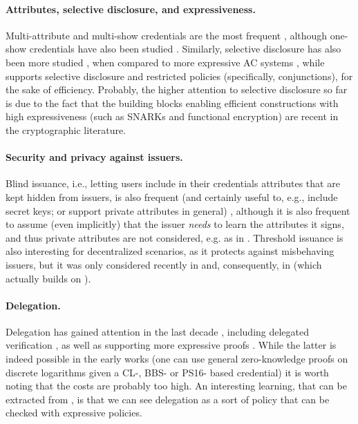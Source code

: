 \paragraph{Attributes, selective disclosure, and expressiveness.} %
Multi-attribute and multi-show credentials are the most frequent
\cite{cks10,cl11,cdhk15,ckl+15,fhs19,sms+19,halp20,hs21}, although one-show
credentials have also been studied \cite{bran00}.
Similarly, selective disclosure has also been more studied
\cite{cks10,cl11,cdhk15,sms+19,halp20,hs21}, when compared to 
more expressive AC systems \cite{bcc+09,cklm14,dmm+18}, while \cite{fhs19}
supports selective disclosure and restricted policies (specifically,
conjunctions), for the sake of efficiency. Probably, the higher attention to
selective disclosure so far is due to the fact that the building blocks enabling
efficient constructions with high expressiveness (such as SNARKs and functional
encryption) are recent in the cryptographic literature.

\paragraph{Security and privacy against issuers.} %
Blind issuance, i.e., letting users include in their credentials attributes that
are kept hidden from issuers, is also frequent (and certainly useful to, e.g.,
include secret keys; or support private attributes in general)
\cite{cklm14,ckl+15}, although it is also frequent to assume (even implicitly)
that the issuer \emph{needs} to learn the attributes it signs, and thus private
attributes are not considered, e.g. as in \cite{dmm+18,fhs19,sms+19}.
%
Threshold issuance is also interesting for decentralized scenarios, as it
protects against misbehaving issuers, but it was only considered recently in
\cite{sms+19} and, consequently, in \cite{halp20} (which actually builds on
\cite{sms+19}). 

\paragraph{Delegation.} %
Delegation has gained attention in the last decade \cite{bcc+09,cklm14},
including delegated verification \cite{dmm+18}, as well as supporting more
expressive proofs \cite{cklm14,dmm+18}. While the latter is indeed possible in
the early works (one can use general zero-knowledge proofs on discrete
logarithms given a CL-, BBS- or PS16- based credential) it is worth noting that
the costs are probably too high. An interesting learning, that can be extracted
from \cite{cklm14}, is that we can see delegation as a sort of policy that can
be checked with expressive policies.

